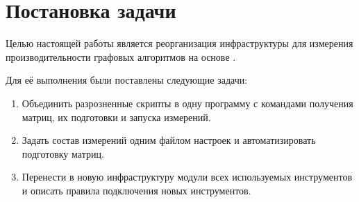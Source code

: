 
\section{Постановка задачи}
\label{sec:task}

Целью настоящей работы является реорганизация инфраструктуры для измерения производительности графовых алгоритмов на основе \INs{}.

Для её выполнения были поставлены следующие задачи:
\begin{enumerate}
    \item Объединить разрозненные скрипты в одну программу с командами получения матриц, их подготовки и запуска измерений.
    \item Задать состав измерений одним файлом настроек и автоматизировать подготовку матриц.
    \item Перенести в новую инфраструктуру модули всех используемых инструментов и описать правила подключения новых инструментов.
\end{enumerate}
